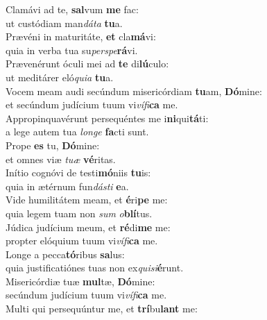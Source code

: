 \evenverse Clamávi ad te, \textbf{sal}vum \textbf{me} fac:~\*\\
\evenverse ut custódiam man\textit{dá}\textit{ta} \textbf{tu}a.\\
\oddverse Prævéni in maturitáte, \textbf{et} cla\textbf{má}vi:~\*\\
\oddverse quia in verba tua su\textit{per}\textit{spe}\textbf{rá}vi.\\
\evenverse Prævenérunt óculi mei ad \textbf{te} di\textbf{lú}culo:~\*\\
\evenverse ut meditárer eló\textit{qui}\textit{a} \textbf{tu}a.\\
\oddverse Vocem meam audi secúndum misericórdiam \textbf{tu}am, \textbf{Dó}mine:~\*\\
\oddverse et secúndum judícium tuum vi\textit{ví}\textit{fi}\textbf{ca} me.\\
\evenverse Appropinquavérunt persequéntes me i\textbf{ni}qui\textbf{tá}ti:~\*\\
\evenverse a lege autem tua \textit{lon}\textit{ge} \textbf{fa}cti sunt.\\
\oddverse Prope \textbf{es} tu, \textbf{Dó}mine:~\*\\
\oddverse et omnes viæ \textit{tu}\textit{æ} \textbf{vé}ritas.\\
\evenverse Inítio cognóvi de testi\textbf{mó}niis \textbf{tu}is:~\*\\
\evenverse quia in ætérnum fun\textit{dá}\textit{sti} \textbf{e}a.\\
\oddverse Vide humilitátem meam, et \textbf{é}ri\textbf{pe} me:~\*\\
\oddverse quia legem tuam non \textit{sum} \textit{o}\textbf{blí}tus.\\
\evenverse Júdica judícium meum, et \textbf{ré}di\textbf{me} me:~\*\\
\evenverse propter elóquium tuum vi\textit{ví}\textit{fi}\textbf{ca} me.\\
\oddverse Longe a pecca\textbf{tó}ribus \textbf{sa}lus:~\*\\
\oddverse quia justificatiónes tuas non ex\textit{qui}\textit{si}\textbf{é}runt.\\
\evenverse Misericórdiæ tuæ \textbf{mul}tæ, \textbf{Dó}mine:~\*\\
\evenverse secúndum judícium tuum vi\textit{ví}\textit{fi}\textbf{ca} me.\\
\oddverse Multi qui persequúntur me, et \textbf{trí}bu\textbf{lant} me:~\*\\
